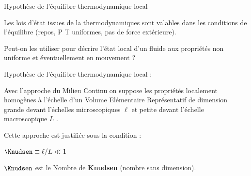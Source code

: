 \begin{frame}{Hypothèse de l'équilibre thermodynamique local}


Les lois d'état issues de la thermodynamiques sont valables dans les conditions de l'équilibre 
(repos, P T uniformes, pas de force extérieure).

\medskip


Peut-on les utiliser pour décrire l'état local d'un fluide aux propriétés non uniforme et éventuellement en mouvement ?

\medskip 

Hypothèse de l'équilibre thermodynamique local : 

\medskip

Avec l'approche du Milieu Continu on suppose les propriétés localement homogènes à l'échelle
d'un Volume Elémentaire Représentatif de dimension grande devant l'échelles microscopiques 
$\ell$ et petite devant l'échelle macroscopique $L$ .

\medskip 
Cette approche est justifiée sous la condition :

\smallskip
$\Knudsen \equiv \ell / L \ll 1 $

\smallskip

$\Knudsen$ est le Nombre de \textcolor{rouge}{\bf Knudsen} (nombre sans dimension).









\vspace{5mm}

\end{frame}




